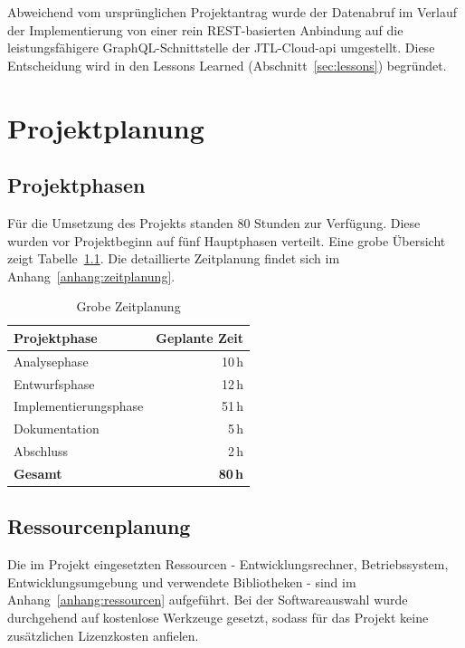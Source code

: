 \documentclass[11pt, a4paper, oneside]{report}
\begin{document}
Abweichend vom ursprünglichen Projektantrag wurde der Datenabruf im Verlauf der
Implementierung von einer rein REST-basierten Anbindung auf die leistungsfähigere
GraphQL-Schnittstelle der JTL-Cloud-\gls{api} umgestellt. Diese Entscheidung wird
in den Lessons Learned (Abschnitt~\ref{sec:lessons}) begründet.

\chapter{Projektplanung}

\section{Projektphasen}

Für die Umsetzung des Projekts standen 80 Stunden zur Verfügung. Diese wurden vor
Projektbeginn auf fünf Hauptphasen verteilt. Eine grobe Übersicht zeigt
Tabelle~\ref{tab:grobe_zeitplanung}. Die detaillierte Zeitplanung findet sich im
Anhang~\ref{anhang:zeitplanung}.

\begin{table}[H]
  \centering
  \caption{Grobe Zeitplanung}
  \label{tab:grobe_zeitplanung}
  \begin{tabularx}{0.6\textwidth}{X r}
    \toprule
    \textbf{Projektphase} & \textbf{Geplante Zeit} \\
    \midrule
    Analysephase          & 10\,h \\
    Entwurfsphase         & 12\,h \\
    Implementierungsphase & 51\,h \\
    Dokumentation         &  5\,h \\
    Abschluss             &  2\,h \\
    \midrule
    \textbf{Gesamt}       & \textbf{80\,h} \\
    \bottomrule
  \end{tabularx}
\end{table}

\section{Ressourcenplanung}

Die im Projekt eingesetzten Ressourcen - Entwicklungsrechner, Betriebssystem,
Entwicklungsumgebung und verwendete Bibliotheken - sind im Anhang~\ref{anhang:ressourcen}
aufgeführt. Bei der Softwareauswahl wurde durchgehend auf kostenlose Werkzeuge gesetzt,
sodass für das Projekt keine zusätzlichen Lizenzkosten anfielen.
\end{document}
